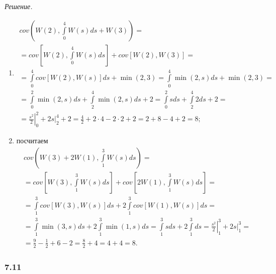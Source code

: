 \textit{Решение.}
\begin{enumerate}[label=\alph*)]
  \item \begin{gather*}
    cov \left(
      W \left( 2 \right), \int \limits_0^4 W \left( s \right) ds + W \left( 3 \right) \right) = \\
    = cov \left[ W \left(2 \right), \int \limits_0^4 W \left( s \right) ds \right] +
    cov \left[ W \left( 2 \right), W \left( 3 \right) \right] = \\
    = \int \limits_0^4 cov \left[ W \left( 2 \right), W \left( s \right) \right] ds +
    \min \left( 2, 3 \right) =
    \int \limits_0^4 \min \left( 2, s \right) ds + \min \left( 2, 3 \right) = \\
    = \int \limits_0^2 \min \left( 2, s \right) ds + \int \limits_2^4 \min \left( 2, s \right) ds +
    2 =
    \int \limits_0^2 sds + \int \limits_2^4 2ds + 2 = \\
    = \left. \frac{s^2}{2} \right|_0^2 + \left. 2s \right|_2^4 + 2 =
    \frac{4}{2} + 2 \cdot 4 - 2 \cdot 2 + 2 =
    2 + 8 - 4 + 2 =
    8;
  \end{gather*}
  \item посчитаем
  \begin{gather*}
    cov \left(
      W \left( 3 \right) + 2 W \left( 1 \right), \int \limits_1^3 W \left( s \right) ds \right) = \\
    = cov \left[ W \left( 3 \right), \int \limits_1^3 W \left( s \right) ds \right] +
    cov \left[ 2W \left( 1 \right), \int \limits_1^3 W \left( s \right) ds \right] = \\
    = \int \limits_1^3 cov \left[ W \left( 3 \right), W \left( s \right) \right] ds +
    2 \int \limits_1^3 cov \left[ W \left( 1 \right), W \left( s \right) \right] ds = \\
    = \int \limits_1^3 \min \left( 3, s \right) ds +
    2 \int \limits_1^3 \min \left( 1, s \right) ds =
    \int \limits_1^3 sds + 2 \int \limits_1^3 ds =
    \left. \frac{s^2}{2} \right|_1^3 + \left. 2s \right|_1^3 = \\
    = \frac{9}{2} - \frac{1}{2} + 6 - 2 =
    \frac{8}{2} + 4 =
    4 + 4 =
    8.
  \end{gather*}
\end{enumerate}

\subsubsection*{7.11}

